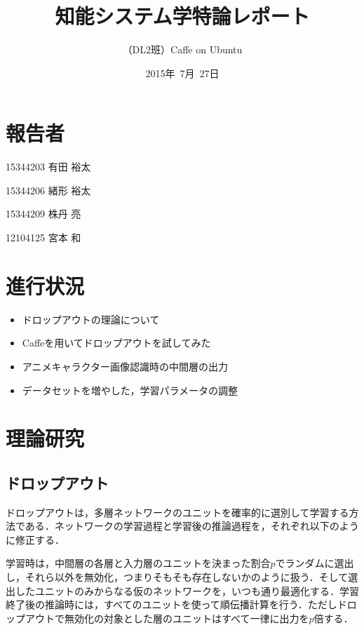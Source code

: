 \documentclass[a4paper,10pt]{jsarticle}
\title{知能システム学特論レポート}
\author{
（DL2班）Caffe on Ubuntu\\
}
\date{2015年\ 7月\ 27日}
\begin{document}
\maketitle
\section{報告者}
\begin{list}{}{}
 \item 15344203\hspace{0.5cm} 有田 裕太
 \item 15344206\hspace{0.5cm} 緒形 裕太
 \item 15344209\hspace{0.5cm} 株丹 亮
 \item 12104125\hspace{0.5cm} 宮本 和
\end{list}

\section{進行状況}

\begin{itemize}
\item ドロップアウトの理論について
\item Caffeを用いてドロップアウトを試してみた
\item アニメキャラクター画像認識時の中間層の出力
\item データセットを増やした，学習パラメータの調整
\end{itemize}

\section{理論研究}
\subsection{ドロップアウト}
ドロップアウトは，多層ネットワークのユニットを確率的に選別して学習する方法である．ネットワークの学習過程と学習後の推論過程を，それぞれ以下のように修正する．

学習時は，中間層の各層と入力層のユニットを決まった割合$p$でランダムに選出し，それら以外を無効化，つまりそもそも存在しないかのように扱う．そして選出したユニットのみからなる仮のネットワークを，いつも通り最適化する．学習終了後の推論時には，すべてのユニットを使って順伝播計算を行う．ただしドロップアウトで無効化の対象とした層のユニットはすべて一律に出力を$p$倍する．
\end{document}
